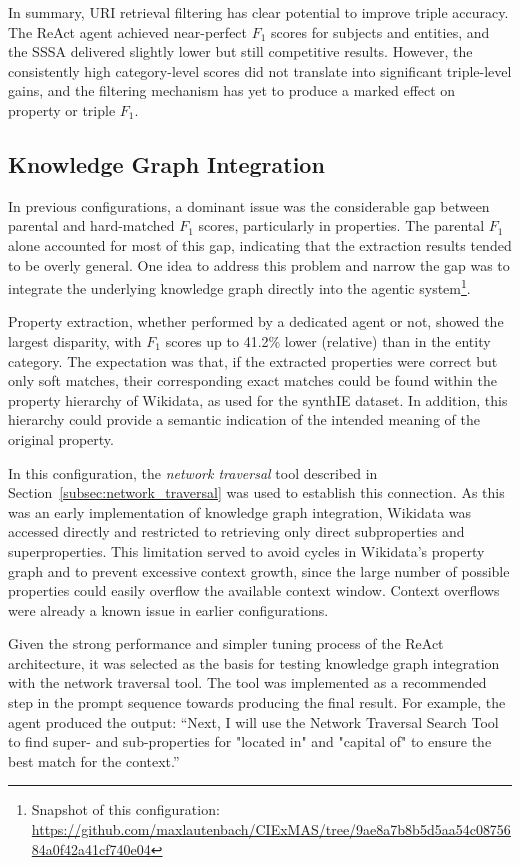 \documentclass[a4paper,oneside,bibliography=totoc]{scrbook}
\begin{document}
In summary, URI retrieval filtering has clear potential to improve triple accuracy. The ReAct agent achieved near-perfect $F_{1}$ scores for subjects and entities, and the \ac{SSSA} delivered slightly lower but still competitive results. However, the consistently high category-level scores did not translate into significant triple-level gains, and the filtering mechanism has yet to produce a marked effect on property or triple $F_{1}$.

\subsection{Knowledge Graph Integration}
\label{subsec:knowledge_graph_integration}

In previous configurations, a dominant issue was the considerable gap between parental and hard-matched $F_{1}$ scores, particularly in properties. The parental $F_{1}$ alone accounted for most of this gap, indicating that the extraction results tended to be overly general. One idea to address this problem and narrow the gap was to integrate the underlying knowledge graph directly into the agentic system\footnote{Snapshot of this configuration: \url{https://github.com/maxlautenbach/CIExMAS/tree/9ae8a7b8b5d5aa54c0875684a0f42a41cf740e04}}.

Property extraction, whether performed by a dedicated agent or not, showed the largest disparity, with $F_{1}$ scores up to 41.2\% lower (relative) than in the entity category. The expectation was that, if the extracted properties were correct but only soft matches, their corresponding exact matches could be found within the property hierarchy of Wikidata, as used for the synthIE dataset. In addition, this hierarchy could provide a semantic indication of the intended meaning of the original property.

In this configuration, the \textit{network traversal} tool described in Section~\ref{subsec:network_traversal} was used to establish this connection. As this was an early implementation of knowledge graph integration, Wikidata was accessed directly and restricted to retrieving only direct subproperties and superproperties. This limitation served to avoid cycles in Wikidata’s property graph and to prevent excessive context growth, since the large number of possible properties could easily overflow the available context window. Context overflows were already a known issue in earlier configurations.

Given the strong performance and simpler tuning process of the ReAct architecture, it was selected as the basis for testing knowledge graph integration with the network traversal tool. The tool was implemented as a recommended step in the prompt sequence towards producing the final result. For example, the agent produced the output: \enquote{Next, I will use the Network Traversal Search Tool to find super- and sub-properties for "located in" and "capital of" to ensure the best match for the context.}
\end{document}
